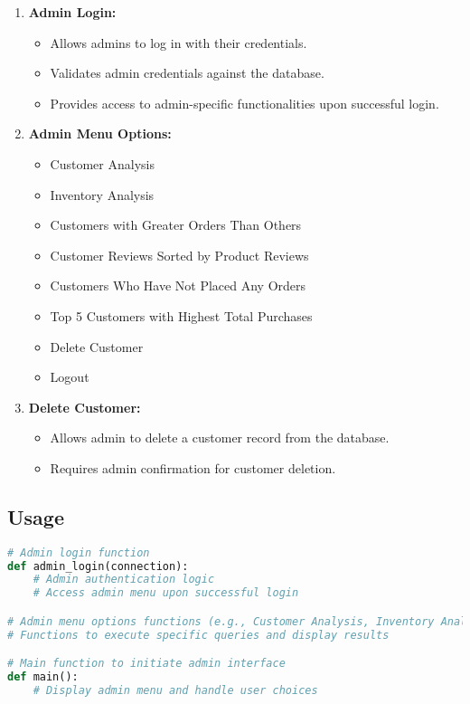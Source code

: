 \documentclass[12pt]{article}
\begin{document}
\begin{enumerate}
    \item \textbf{Admin Login:}
        \begin{itemize}
            \item Allows admins to log in with their credentials.
            \item Validates admin credentials against the database.
            \item Provides access to admin-specific functionalities upon successful login.
        \end{itemize}
    
    \item \textbf{Admin Menu Options:}
        \begin{itemize}
            \item Customer Analysis
            \item Inventory Analysis
            \item Customers with Greater Orders Than Others
            \item Customer Reviews Sorted by Product Reviews
            \item Customers Who Have Not Placed Any Orders
            \item Top 5 Customers with Highest Total Purchases
            \item Delete Customer
            \item Logout
        \end{itemize}
    
    \item \textbf{Delete Customer:}
        \begin{itemize}
            \item Allows admin to delete a customer record from the database.
            \item Requires admin confirmation for customer deletion.
        \end{itemize}
\end{enumerate}

\subsection{Usage}
\begin{lstlisting}[language=Python]
# Admin login function
def admin_login(connection):
    # Admin authentication logic
    # Access admin menu upon successful login

# Admin menu options functions (e.g., Customer Analysis, Inventory Analysis)
# Functions to execute specific queries and display results

# Main function to initiate admin interface
def main():
    # Display admin menu and handle user choices
\end{lstlisting}
\end{document}
